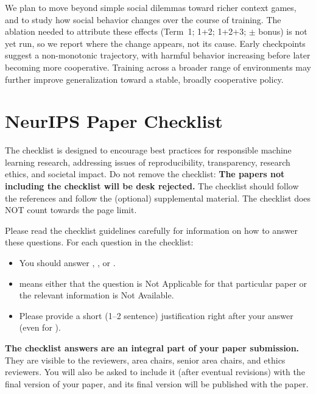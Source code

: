 \documentclass{article}
\begin{document}
We plan to move beyond simple social dilemmas toward richer context games, and to study how social behavior changes over the course of training. The ablation needed to attribute these effects (Term~1; 1+2; 1+2+3; $\pm$ bonus) is not yet run, so we report where the change appears, not its cause. Early checkpoints suggest a non-monotonic trajectory, with harmful behavior increasing before later becoming more cooperative. Training across a broader range of environments may further improve generalization toward a stable, broadly cooperative policy.




\section*{NeurIPS Paper Checklist}

The checklist is designed to encourage best practices for responsible machine learning research, addressing issues of reproducibility, transparency, research ethics, and societal impact. Do not remove the checklist: {\bf The papers not including the checklist will be desk rejected.} The checklist should follow the references and follow the (optional) supplemental material.  The checklist does NOT count towards the page
limit.

Please read the checklist guidelines carefully for information on how to answer these questions. For each question in the checklist:
\begin{itemize}
    \item You should answer \answerYes{}, \answerNo{}, or \answerNA{}.
    \item \answerNA{} means either that the question is Not Applicable for that particular paper or the relevant information is Not Available.
    \item Please provide a short (1--2 sentence) justification right after your answer (even for \answerNA).
\end{itemize}

{\bf The checklist answers are an integral part of your paper submission.} They are visible to the reviewers, area chairs, senior area chairs, and ethics reviewers. You will also be asked to include it (after eventual revisions) with the final version of your paper, and its final version will be published with the paper.
\end{document}

